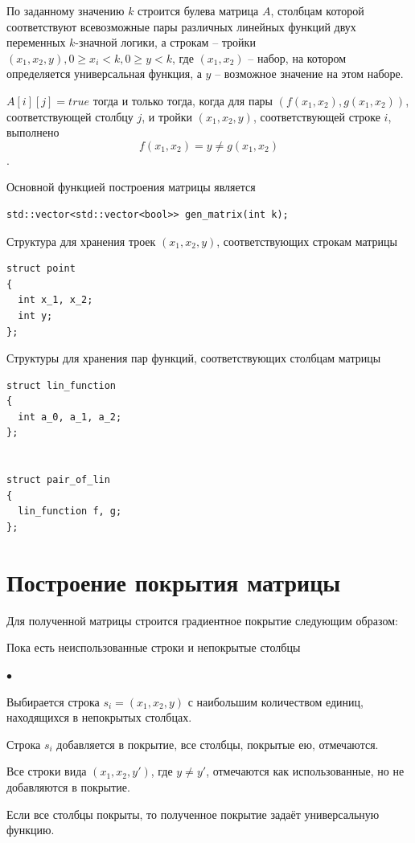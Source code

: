 \documentclass[oneside,final,14pt]{extreport}
\newenvironment{compactlist}{
    \begin{list}{{$\bullet$}}{
      \setlength\partopsep{0pt}
      \setlength\parskip{0pt}
      \setlength\parsep{0pt}
      \setlength\topsep{0pt}
      \setlength\itemsep{0pt}
} }{

 \end{list} 
}
\begin{document}
По заданному значению \(k\) строится булева матрица \(A\), столбцам которой соответствуют всевозможные пары различных линейных 
функций двух переменных \(k\)-значной логики, а строкам -- тройки \((x_1, x_2, y), 0 \geq x_i < k, 0 \geq y < k\), 
где \((x_1, x_2)\) -- набор, на котором определяется универсальная функция, а \(y\) -- возможное значение на этом наборе.

\(A[i][j] = true\) тогда и только тогда, когда для пары \((f(x_1, x_2), g(x_1, x_2))\), соответствующей столбцу \(j\), и тройки 
\((x_1, x_2, y)\), соответствующей строке \(i\), выполнено \[f(x_1, x_2) = y \neq g(x_1, x_2)\].

Основной функцией построения матрицы является

\begin{lstlisting}
std::vector<std::vector<bool>> gen_matrix(int k);
\end{lstlisting}

Структура для хранения троек \((x_1, x_2, y)\), соответствующих строкам матрицы
\begin{lstlisting}
struct point
{
  int x_1, x_2;
  int y;
};
\end{lstlisting}

Структуры для хранения пар функций, соответствующих столбцам матрицы
\begin{lstlisting}
struct lin_function
{
  int a_0, a_1, a_2;
};


struct pair_of_lin
{
  lin_function f, g;
};
\end{lstlisting}




\section{Построение покрытия матрицы}

Для полученной матрицы строится градиентное покрытие следующим образом:
\begin{enumerate}
\item Пока есть неиспользованные строки и непокрытые столбцы
\begin{compactlist}
\item Выбирается строка \(s_i = (x_1, x_2, y)\) с наибольшим количеством единиц, находящихся в непокрытых столбцах.
\item Строка \(s_i\) добавляется в покрытие, все столбцы, покрытые ею, отмечаются.
\item Все строки вида \((x_1, x_2, y')\), где \(y \neq y'\), отмечаются как использованные, но не добавляются в покрытие.
\end{compactlist}
\item Если все столбцы покрыты, то полученное покрытие задаёт универсальную функцию.
\end{enumerate}
\end{document}
